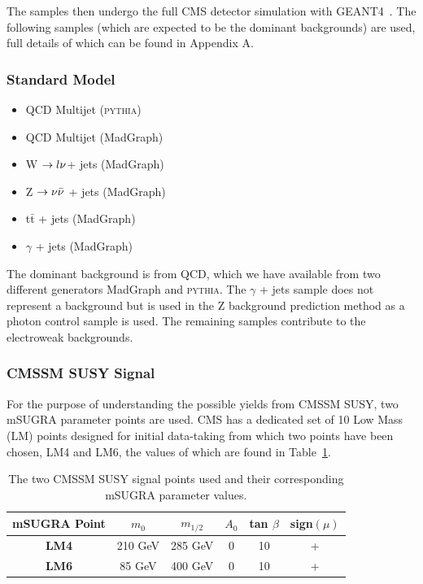 The samples then undergo the full CMS detector simulation with GEANT4~\cite{GEANT4}. The following samples (which are expected to be the dominant backgrounds) are used, full details of which can be found in Appendix A. 

\subsubsection{Standard Model}
\begin{itemize}
\item QCD Multijet (\textsc{pythia})
\item QCD Multijet (MadGraph)
\item W $\rightarrow l\nu$+ jets (MadGraph)
\item Z $\rightarrow \nu\bar{\nu}$ + jets (MadGraph)
\item t$\bar{\textrm{t}}$ + jets (MadGraph)
\item $\gamma$ + jets (MadGraph)
\end{itemize}

The dominant background is from QCD, which we have available from two different generators MadGraph and \textsc{pythia}. The $\gamma$ + jets sample does not represent a background but is used in the Z background prediction method as a photon control sample is used. The remaining samples contribute to the electroweak backgrounds. 

\subsubsection{CMSSM SUSY Signal}
For the purpose of understanding the possible yields from CMSSM SUSY, two mSUGRA parameter points are used. CMS has a dedicated set of 10 Low Mass (LM) points designed for initial data-taking from which two points have been chosen, LM4 and LM6, the values of which are found in Table~\ref{tab:LM}.

\begin{table}[htbp]
\centering
\begin{tabular}{c c c c c c }
\hline
\hline
\textbf{mSUGRA Point} & $m_{0}$ & $m_{1/2}$ & $A_{0}$ & tan $\beta$ & sign$(\mu) $ \\
\hline
\hline
\textbf{LM4} & 210 GeV & 285 GeV & 0 & 10 & + \\
\textbf{LM6} & 85 GeV & 400 GeV & 0 & 10 & +\\
\hline
\end{tabular}
\caption{\label{tab:LM}The two CMSSM SUSY signal points used and their corresponding mSUGRA parameter values.}
\end{table}

